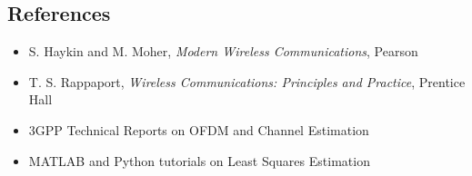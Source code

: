 \subsection{References}
\begin{itemize}
  \item S. Haykin and M. Moher, \textit{Modern Wireless Communications}, Pearson
  \item T. S. Rappaport, \textit{Wireless Communications: Principles and Practice}, Prentice Hall
  \item 3GPP Technical Reports on OFDM and Channel Estimation
  \item MATLAB and Python tutorials on Least Squares Estimation
\end{itemize}


